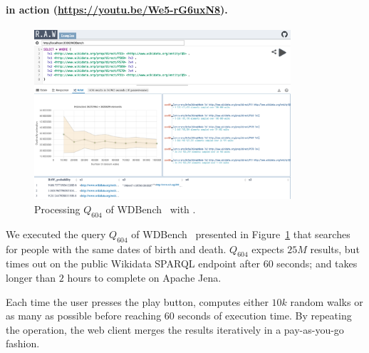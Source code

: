 \paragraph{\NAME in action (\url{https://youtu.be/We5-rG6uxN8}).}


 \begin{figure}
   \centering
   \includegraphics[width=0.85\textwidth]{figures/raw_screenshot.png}
   \caption{\label{fig:raw_screenshot} Processing $Q_{604}$ of
     WDBench~\cite{angles2022wdbench} with \NAME.}
 \end{figure}


We executed the query $Q_{604}$ of WDBench~\cite{angles2022wdbench}
presented in Figure~\ref{fig:raw_screenshot} that searches for people
with the same dates of birth and death. $Q_{604}$ expects $25M$
results, but times out on the public Wikidata SPARQL endpoint after
$60$ seconds; and takes longer than $2$ hours to complete on Apache
Jena.


\noindent Each time the user presses the play button, \NAME computes
either $10k$ random walks or as many as possible before reaching $60$
seconds of execution time. By repeating the operation, the web client
merges the results iteratively in a pay-as-you-go fashion.


